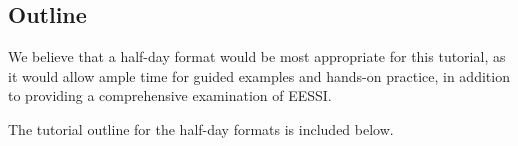 \subsection*{Outline}


We believe that a half-day format would be most appropriate for this tutorial, as it would allow ample time for guided examples and hands-on practice, in addition to providing a comprehensive examination of EESSI.

The tutorial outline for the half-day formats is included below.

% 

